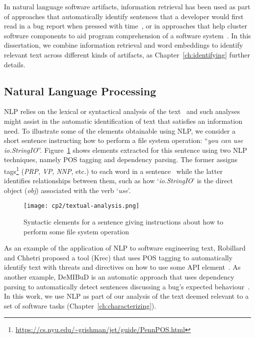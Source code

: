 
In natural language software artifacts, 
information retrieval has been used 
as part of approaches that
automatically identify sentences  that a developer would first read in a bug report 
when pressed with time~\cite{Lotufo2012},
or in approaches that help cluster software components to aid program comprehension of a software system~\cite{Marcus2003}.
In this dissertation, we combine information retrieval and word embeddings 
to identify relevant text across different kinds of artifacts, as Chapter~\ref{ch:identifying} further details.



\subsection{Natural Language Processing }
\label{cp2:nlp}


\acf{NLP} relies on the lexical or syntactical analysis of the text~\cite{jurafsky2014speech}
and such analyses might assist in the automatic identification of text that satisfies an information need. 
To illustrate some of the elements obtainable using \acs{NLP}, we consider a short sentence 
instructing how to perform a file system operation: ``\textit{you can use io.StringIO}''.
Figure~\ref{fig:nlp-analysis} shows elements extracted for this sentence using two \acs{NLP} techniques,
namely \acf{POS} tagging and dependency parsing.
The former assigns tags\footnote{\url{https://cs.nyu.edu/~grishman/jet/guide/PennPOS.html}} ({\small \textit{PRP}, \textit{VP}, \textit{NNP},} etc.) to each word 
in a sentence~\cite{taylor2003penn} while the latter identifies
relationships between them, such as how 
`\textit{io.StringIO}' is the direct object (\textit{obj})
associated with the verb `\textit{use}'.



\begin{figure}[h!]
    \centering
    \texttt{[image: cp2/textual-analysis.png]}
    \caption{Syntactic elements for a sentence giving instructions about how to perform some file system operation}
    \label{fig:nlp-analysis}
\end{figure}


As an example of the application of \ac{NLP} to software engineering text,
Robillard  and Chhetri proposed a tool (Krec)
that uses \acs{POS} tagging to automatically 
identify text with threats and directives on how to use some API element~\cite{Robillard2015}.
As another example, {\small DeMIBuD}
is an automatic approach that uses dependency parsing
to automatically detect sentences discussing a bug's expected behaviour~\cite{Chaparro2017}.
In this work, we use \acs{NLP} as part of our 
analysis of the text deemed relevant to a set of software tasks (Chapter~\ref{ch:characterizing}).



